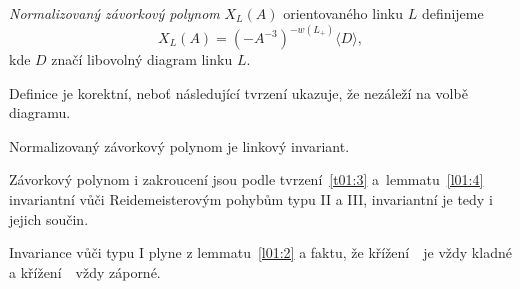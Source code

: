 \begin{definice}\label{def01:4}
\emph{Normalizovaný závorkový polynom} $X_L(A)$ orientovaného linku $L$ definijeme $$X_L(A) = \left(-A^{-3}\right)^{-w\left(L_+\right)}\langle D \rangle,$$ kde $D$ značí libovolný diagram linku $L$.
\end{definice}

\begin{pozn}
Definice je korektní, neboť následující tvrzení ukazuje, že nezáleží na volbě diagramu.
\end{pozn}

\begin{tvrz}\label{t01:5}
Normalizovaný závorkový polynom je linkový invariant.
\end{tvrz}
\begin{dukaz}
Závorkový polynom i zakroucení jsou podle tvrzení~\ref{t01:3} a~lemmatu~\ref{l01:4} invariantní vůči Reidemeisterovým pohybům typu II a III, invariantní je tedy i jejich součin.

Invariance vůči typu I plyne z lemmatu~\ref{l01:2} a faktu, že křížení~\plussmycka~je vždy kladné a křížení~\minussmycka~vždy záporné.
\end{dukaz}

